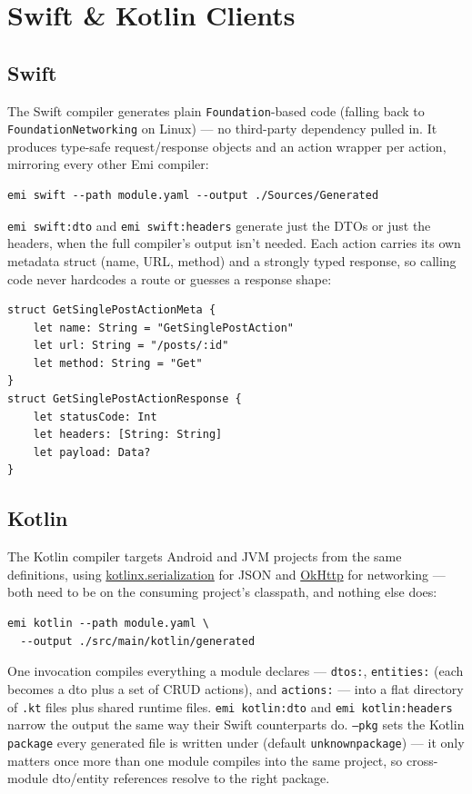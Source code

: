 \section{Swift \& Kotlin Clients}
\label{sec:swift-kotlin}

\subsection{Swift}
The Swift compiler generates plain \texttt{Foundation}-based code (falling
back to \texttt{FoundationNetworking} on Linux) --- no third-party
dependency pulled in. It produces type-safe request/response objects and
an action wrapper per action, mirroring every other Emi compiler:
\begin{lstlisting}
emi swift --path module.yaml --output ./Sources/Generated
\end{lstlisting}
\texttt{emi swift:dto} and \texttt{emi swift:headers} generate just the
DTOs or just the headers, when the full compiler's output isn't needed.
Each action carries its own metadata struct (name, URL, method) and a
strongly typed response, so calling code never hardcodes a route or
guesses a response shape:
\begin{lstlisting}
struct GetSinglePostActionMeta {
    let name: String = "GetSinglePostAction"
    let url: String = "/posts/:id"
    let method: String = "Get"
}
struct GetSinglePostActionResponse {
    let statusCode: Int
    let headers: [String: String]
    let payload: Data?
}
\end{lstlisting}

\subsection{Kotlin}
The Kotlin compiler targets Android and JVM projects from the same
definitions, using \href{https://github.com/Kotlin/kotlinx.serialization}{kotlinx.serialization}
for JSON and \href{https://square.github.io/okhttp/}{OkHttp} for
networking --- both need to be on the consuming project's classpath, and
nothing else does:
\begin{lstlisting}
emi kotlin --path module.yaml \
  --output ./src/main/kotlin/generated
\end{lstlisting}
One invocation compiles everything a module declares --- \texttt{dtos:},
\texttt{entities:} (each becomes a dto plus a set of CRUD actions), and
\texttt{actions:} --- into a flat directory of \texttt{.kt} files plus
shared runtime files. \texttt{emi kotlin:dto} and \texttt{emi
kotlin:headers} narrow the output the same way their Swift counterparts
do. \texttt{--pkg} sets the Kotlin \texttt{package} every generated file
is written under (default \texttt{unknownpackage}) --- it only matters
once more than one module compiles into the same project, so cross-module
dto/entity references resolve to the right package.

